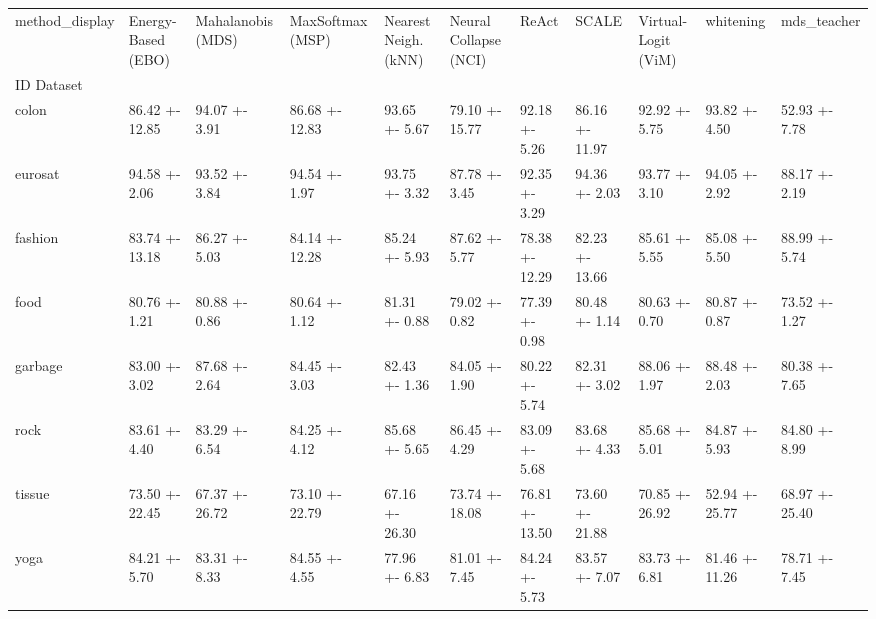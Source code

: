 \begin{tabular}{lllllllllll}
\toprule
method_display & Energy-Based (EBO) & Mahalanobis (MDS) & MaxSoftmax (MSP) & Nearest Neigh. (kNN) & Neural Collapse (NCI) & ReAct & SCALE & Virtual-Logit (ViM) & whitening & mds_teacher \\
ID Dataset &  &  &  &  &  &  &  &  &  &  \\
\midrule
colon & 86.42 +- 12.85 & 94.07 +- 3.91 & 86.68 +- 12.83 & 93.65 +- 5.67 & 79.10 +- 15.77 & 92.18 +- 5.26 & 86.16 +- 11.97 & 92.92 +- 5.75 & 93.82 +- 4.50 & 52.93 +- 7.78 \\
eurosat & 94.58 +- 2.06 & 93.52 +- 3.84 & 94.54 +- 1.97 & 93.75 +- 3.32 & 87.78 +- 3.45 & 92.35 +- 3.29 & 94.36 +- 2.03 & 93.77 +- 3.10 & 94.05 +- 2.92 & 88.17 +- 2.19 \\
fashion & 83.74 +- 13.18 & 86.27 +- 5.03 & 84.14 +- 12.28 & 85.24 +- 5.93 & 87.62 +- 5.77 & 78.38 +- 12.29 & 82.23 +- 13.66 & 85.61 +- 5.55 & 85.08 +- 5.50 & 88.99 +- 5.74 \\
food & 80.76 +- 1.21 & 80.88 +- 0.86 & 80.64 +- 1.12 & 81.31 +- 0.88 & 79.02 +- 0.82 & 77.39 +- 0.98 & 80.48 +- 1.14 & 80.63 +- 0.70 & 80.87 +- 0.87 & 73.52 +- 1.27 \\
garbage & 83.00 +- 3.02 & 87.68 +- 2.64 & 84.45 +- 3.03 & 82.43 +- 1.36 & 84.05 +- 1.90 & 80.22 +- 5.74 & 82.31 +- 3.02 & 88.06 +- 1.97 & 88.48 +- 2.03 & 80.38 +- 7.65 \\
rock & 83.61 +- 4.40 & 83.29 +- 6.54 & 84.25 +- 4.12 & 85.68 +- 5.65 & 86.45 +- 4.29 & 83.09 +- 5.68 & 83.68 +- 4.33 & 85.68 +- 5.01 & 84.87 +- 5.93 & 84.80 +- 8.99 \\
tissue & 73.50 +- 22.45 & 67.37 +- 26.72 & 73.10 +- 22.79 & 67.16 +- 26.30 & 73.74 +- 18.08 & 76.81 +- 13.50 & 73.60 +- 21.88 & 70.85 +- 26.92 & 52.94 +- 25.77 & 68.97 +- 25.40 \\
yoga & 84.21 +- 5.70 & 83.31 +- 8.33 & 84.55 +- 4.55 & 77.96 +- 6.83 & 81.01 +- 7.45 & 84.24 +- 5.73 & 83.57 +- 7.07 & 83.73 +- 6.81 & 81.46 +- 11.26 & 78.71 +- 7.45 \\
\bottomrule
\end{tabular}
